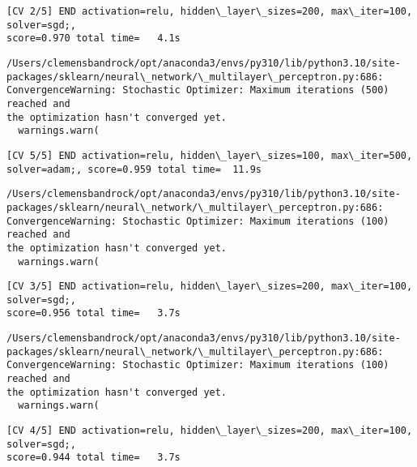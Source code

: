 \documentclass[11pt]{article}
\begin{document}
    \begin{Verbatim}[commandchars=\\\{\}]
[CV 2/5] END activation=relu, hidden\_layer\_sizes=200, max\_iter=100, solver=sgd;,
score=0.970 total time=   4.1s
    \end{Verbatim}

    \begin{Verbatim}[commandchars=\\\{\}]
/Users/clemensbandrock/opt/anaconda3/envs/py310/lib/python3.10/site-
packages/sklearn/neural\_network/\_multilayer\_perceptron.py:686:
ConvergenceWarning: Stochastic Optimizer: Maximum iterations (500) reached and
the optimization hasn't converged yet.
  warnings.warn(
    \end{Verbatim}

    \begin{Verbatim}[commandchars=\\\{\}]
[CV 5/5] END activation=relu, hidden\_layer\_sizes=100, max\_iter=500,
solver=adam;, score=0.959 total time=  11.9s
    \end{Verbatim}

    \begin{Verbatim}[commandchars=\\\{\}]
/Users/clemensbandrock/opt/anaconda3/envs/py310/lib/python3.10/site-
packages/sklearn/neural\_network/\_multilayer\_perceptron.py:686:
ConvergenceWarning: Stochastic Optimizer: Maximum iterations (100) reached and
the optimization hasn't converged yet.
  warnings.warn(
    \end{Verbatim}

    \begin{Verbatim}[commandchars=\\\{\}]
[CV 3/5] END activation=relu, hidden\_layer\_sizes=200, max\_iter=100, solver=sgd;,
score=0.956 total time=   3.7s
    \end{Verbatim}

    \begin{Verbatim}[commandchars=\\\{\}]
/Users/clemensbandrock/opt/anaconda3/envs/py310/lib/python3.10/site-
packages/sklearn/neural\_network/\_multilayer\_perceptron.py:686:
ConvergenceWarning: Stochastic Optimizer: Maximum iterations (100) reached and
the optimization hasn't converged yet.
  warnings.warn(
    \end{Verbatim}

    \begin{Verbatim}[commandchars=\\\{\}]
[CV 4/5] END activation=relu, hidden\_layer\_sizes=200, max\_iter=100, solver=sgd;,
score=0.944 total time=   3.7s
    \end{Verbatim}
\end{document}

